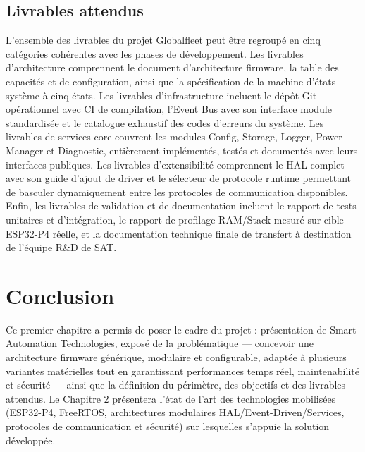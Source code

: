 \subsection{Livrables attendus}
\label{subsec:livrables}

L'ensemble des livrables du projet Globalfleet peut être regroupé en
cinq catégories cohérentes avec les phases de développement. Les
livrables d'architecture comprennent le document d'architecture
firmware, la table des capacités et de configuration, ainsi que la
spécification de la machine d'états système à cinq états. Les
livrables d'infrastructure incluent le dépôt Git opérationnel avec
CI de compilation, l'Event Bus avec son interface module standardisée
et le catalogue exhaustif des codes d'erreurs du système. Les
livrables de services core couvrent les modules Config, Storage,
Logger, Power Manager et Diagnostic, entièrement implémentés, testés
et documentés avec leurs interfaces publiques. Les livrables
d'extensibilité comprennent le HAL complet avec son guide d'ajout
de driver et le sélecteur de protocole runtime permettant de basculer
dynamiquement entre les protocoles de communication disponibles.
Enfin, les livrables de validation et de documentation incluent le
rapport de tests unitaires et d'intégration, le rapport de profilage
RAM/Stack mesuré sur cible ESP32-P4 réelle, et la documentation
technique finale de transfert à destination de l'équipe R\&D de SAT.

\section{Conclusion}
\label{sec:conclu_ch1}
Ce premier chapitre a permis de poser le cadre du projet : présentation de Smart Automation Technologies, exposé de la problématique — concevoir une architecture firmware générique, modulaire et configurable, adaptée à plusieurs variantes matérielles tout en garantissant performances temps réel, maintenabilité et sécurité — ainsi que la définition du périmètre, des objectifs et des livrables attendus. Le Chapitre 2 présentera l'état de l'art des technologies mobilisées (ESP32-P4, FreeRTOS, architectures modulaires HAL/Event-Driven/Services, protocoles de communication et sécurité) sur lesquelles s'appuie la solution développée.